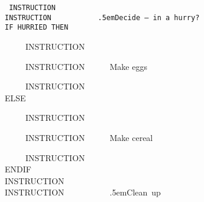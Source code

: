 {\tt\noindent
INSTRUCTION\\
INSTRUCTION~~~~~~~~~~~\raise.5em\hbox{Decide -- in a hurry?}\\
IF HURRIED THEN\\
\strut~~~~~INSTRUCTION\\
\strut~~~~~INSTRUCTION~~~~~~Make eggs\\
\strut~~~~~INSTRUCTION\\
ELSE\\
\strut~~~~~INSTRUCTION\\
\strut~~~~~INSTRUCTION~~~~~~Make cereal\\
\strut~~~~~INSTRUCTION\\
ENDIF\\
INSTRUCTION\\
INSTRUCTION~~~~~~~~~~~\raise.5em\hbox{Clean up}
}